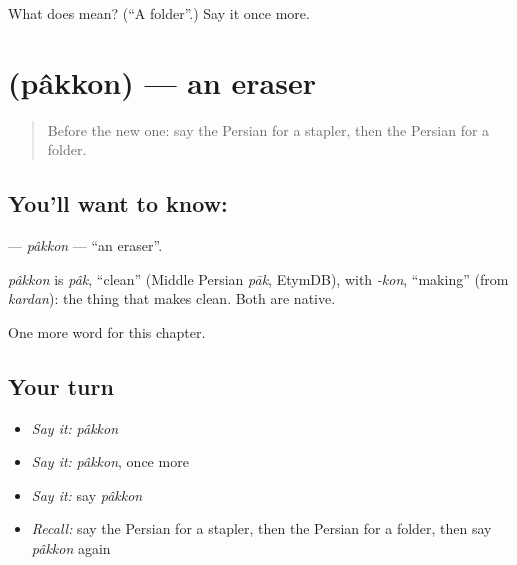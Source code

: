 \begin{tcolorbox}[breakable,colback=teal!4,colframe=teal!35!black,title={Before you move on}]
What does  mean? (\textquotedblleft{}A folder\textquotedblright{}.) Say it once more.
\end{tcolorbox}
\section[\texorpdfstring{\fa{پاک} \fa{کن} (pâkkon)}{پاک کن (pâkkon)}]{  (pâkkon) — an eraser}

\label{lesson:FA-C178-pakkon}



\begin{quote}
Before the new one: say the Persian for a stapler, then the Persian for a folder.
\end{quote}

\subsection*{You'll want to know:  }
\textbf{ } — \emph{pâkkon} — \textquotedblleft{}an eraser\textquotedblright{}.

\begin{cousinweb}
\emph{pâkkon} is \emph{pâk}, \textquotedblleft{}clean\textquotedblright{} (Middle Persian \emph{pāk}, EtymDB), with \emph{-kon}, \textquotedblleft{}making\textquotedblright{} (from \emph{kardan}): the thing that makes clean. Both are native.
\end{cousinweb}

\begin{grammarlens}[title={What you've built}]
One more word for this chapter.
\end{grammarlens}

\subsection*{Your turn}
\begin{itemize}
\raggedright
  \item \emph{Say it:} \emph{pâkkon}
  \item \emph{Say it:} \emph{pâkkon}, once more
  \item \emph{Say it:} say \emph{pâkkon}
  \item \emph{Recall:} say the Persian for a stapler, then the Persian for a folder, then say \emph{pâkkon} again
\end{itemize}

